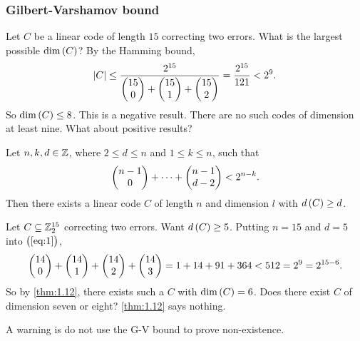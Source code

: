 \pagebreak

\subsubsection{Gilbert-Varshamov bound}

\begin{example*}
Let $ C $ be a linear code of length $ 15 $ correcting two errors. What is the largest possible $ \dim\br{C} $? By the Hamming bound,
$$ \abs{C} \le \dfrac{2^{15}}{\begin{pmatrix} 15 \\ 0 \end{pmatrix} + \begin{pmatrix} 15 \\ 1 \end{pmatrix} + \begin{pmatrix} 15 \\ 2 \end{pmatrix}} = \dfrac{2^{15}}{121} < 2^9. $$
So $ \dim\br{C} \le 8 $. This is a negative result. There are no such codes of dimension at least nine. What about positive results?
\end{example*}

\begin{theorem}[G-V bound]
\label{thm:1.12}
Let $ n, k, d \in \mathbb{Z} $, where $ 2 \le d \le n $ and $ 1 \le k \le n $, such that
\begin{equation}
\label{eq:1}
\begin{pmatrix} n - 1 \\ 0 \end{pmatrix} + \dots + \begin{pmatrix} n - 1 \\ d - 2 \end{pmatrix} < 2^{n - k}.
\end{equation}
Then there exists a linear code $ C $ of length $ n $ and dimension $ l $ with $ d\br{C} \ge d $.
\end{theorem}

\begin{example*}
Let $ C \subseteq \mathbb{Z}_2^{15} $ correcting two errors. Want $ d\br{C} \ge 5 $. Putting $ n = 15 $ and $ d = 5 $ into $ \br{\ref{eq:1}} $,
$$ \begin{pmatrix} 14 \\ 0 \end{pmatrix} + \begin{pmatrix} 14 \\ 1 \end{pmatrix} + \begin{pmatrix} 14 \\ 2 \end{pmatrix} + \begin{pmatrix} 14 \\ 3 \end{pmatrix} = 1 + 14 + 91 + 364 < 512 = 2^9 = 2^{15 - 6}. $$
So by \ref{thm:1.12}, there exists such a $ C $ with $ \dim\br{C} = 6 $. Does there exist $ C $ of dimension seven or eight? \ref{thm:1.12} says nothing.
\end{example*}

A warning is do not use the G-V bound to prove non-existence.

